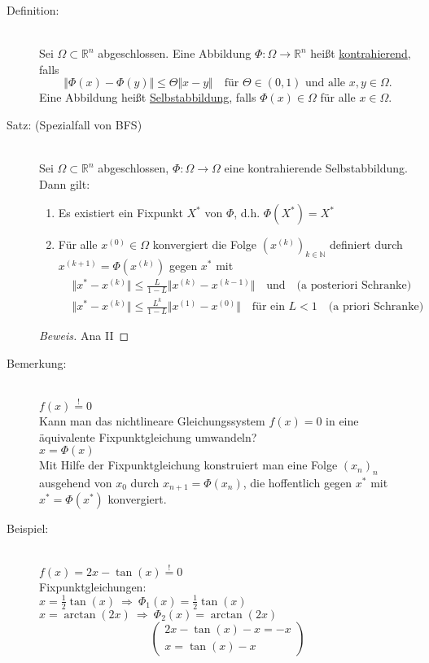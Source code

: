 \documentclass[12pt]{article}
\theoremstyle{break}
\begin{document}
\begin{description}
  \item[Definition:] \leavevmode \\
  Sei $\Omega \subset \mathbb{R}^n$ abgeschlossen. Eine Abbildung $\Phi\colon \Omega \rightarrow \mathbb{R}^n$ heißt \underline{kontrahierend}, falls
  $$ \Vert \Phi(x) - \Phi(y) \Vert \leq \Theta \Vert x-y \Vert \quad \text{für } \Theta \in (0,1) \text{ und alle } x, y \in \Omega.$$
  Eine Abbildung heißt \underline{Selbstabbildung}, falls $\Phi(x) \in \Omega$ für alle $x \in \Omega$.
  
  \item[Satz: (Spezialfall von BFS)] \leavevmode \\
  Sei $\Omega \subset \mathbb{R}^n$ abgeschlossen, $\Phi: \Omega \rightarrow \Omega$ eine kontrahierende Selbstabbildung. Dann gilt:
  \renewcommand{\labelenumi}{\roman{enumi})}
  \begin{enumerate}
    \item Es existiert ein Fixpunkt $X^*$ von $\Phi$, d.h. $\Phi(X^*) = X^*$
    \item Für alle $x^{(0)} \in \Omega$ konvergiert die Folge $(x^{(k)})_{k \in \mathbb{N}}$ definiert durch $x^{(k+1)} = \Phi(x^{(k)})$ gegen $x^*$ mit 
    \begin{align*}
      &\Vert x^{*} - x^{(k)} \Vert \leq \frac{L}{1-L} \Vert x^{(k)} - x^{(k-1)} \Vert \quad \text{und} \quad \text{(a posteriori Schranke)}  &\\
      &\Vert x^* - x^{(k)} \Vert \leq \frac{L^k}{1-L} \Vert x^{(1)} - x^{(0)} \Vert \quad \text{für ein } L < 1 \quad \text{(a priori Schranke)}
    \end{align*}
  \end{enumerate}
  \begin{proof}[Beweis] 
  Ana II
  \end{proof}
  
  \item[Bemerkung:] \leavevmode \\
  $f(x) \overset{!}{=} 0$ \\
  Kann man das nichtlineare Gleichungssystem $f(x) = 0$ in eine äquivalente Fixpunktgleichung umwandeln?\\
  $x = \Phi(x)$ \\
  Mit Hilfe der Fixpunktgleichung konstruiert man eine Folge $(x_n)_n$ ausgehend von $x_0$ durch $x_{n+1} = \Phi(x_n)$, die hoffentlich gegen $x^*$ mit $x^* = \Phi(x^*)$ konvergiert.
  
  \item[Beispiel:] \leavevmode \\
  $f(x) = 2x - \tan(x) \overset{!}{=} 0$ \\
  Fixpunktgleichungen:\\
  $x = \frac{1}{2} \tan(x) \medspace \Rightarrow \medspace \Phi_1(x) = \frac{1}{2} \tan(x)$ \\
  $x = \arctan(2x) \medspace \Rightarrow \medspace \Phi_2(x) = \arctan(2x)$ 
  $$\left( \begin{array}{l} 2x - \tan(x) - x = -x \\ x = \tan(x) -x \end{array} \right)$$
\end{description}
\end{document}
